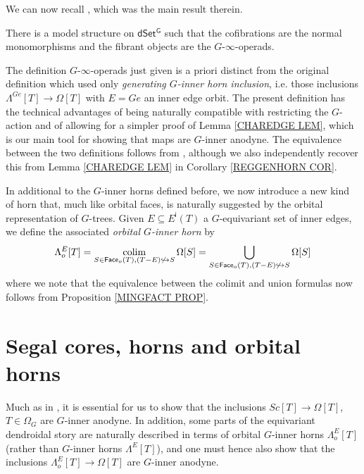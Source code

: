 \documentclass[a4paper,10pt,draft]{article}%
\begin{document}
We can now recall \cite[Thm 2.1]{Per17}, which was the main result therein.

\begin{theorem}
	There is a model structure on $\mathsf{dSet^G}$
	such that the cofibrations are the normal monomorphisms and the fibrant objects are the $G$-$\infty$-operads.
\end{theorem}


\begin{remark}
The definition $G$-$\infty$-operads just given is a priori distinct from the original definition \cite[Def. 6.12]{Per17} which used only 
\textit{generating $G$-inner horn inclusion}, i.e. 
those inclusions $\Lambda^{Ge}[T] \to \Omega[T]$ with $E=Ge$ an inner edge orbit.
The present definition has the technical advantages of being naturally compatible with restricting the $G$-action and of allowing for a simpler proof of Lemma \ref{CHAREDGE LEM}, 
which is our main tool for showing that maps
are $G$-inner anodyne.
The equivalence between the two definitions follows from 
\cite[Prop. 6.17]{Per17},
although we also independently recover this 
from Lemma \ref{CHAREDGE LEM} in Corollary \ref{REGGENHORN COR}.
\end{remark}

In additional to the $G$-inner horns defined before, we now introduce a new kind of horn that, much like orbital faces,
is naturally suggested by the orbital representation of $G$-trees.
Given $E \subseteq E^{\mathsf{i}}(T)$ a $G$-equivariant set of inner edges, we define the associated 
\textit{orbital $G$-inner horn} by
\[
	\Lambda^{E}_o[T] = 
	\mathop{\operatorname{colim}}_{S \in 
	\mathsf{Face}_o(T),
	(T - E) \not \hookrightarrow S}
	\Omega[S] =
	\bigcup_{S \in 
	\mathsf{Face}_o(T),
	(T - E) \not \hookrightarrow S}
	\Omega[S]
\]
where we note that the equivalence between the colimit and union formulas now follows from Proposition \ref{MINGFACT PROP}.



\section{Segal cores, horns and orbital horns}

Much as in \cite[\S 2]{CM13a}, 
it is essential for us to show that the inclusions $Sc[T] \to \Omega[T]$, $T\in \Omega_G$ are $G$-inner anodyne.
In addition, some parts of the equivariant dendroidal story are 
naturally described in terms of 
orbital $G$-inner horns $\Lambda^E_o[T]$ 
(rather than $G$-inner horns $\Lambda^E[T]$),
and one must hence also show that the inclusions
$\Lambda^E_o[T] \to \Omega[T]$
are $G$-inner anodyne.
\end{document}
